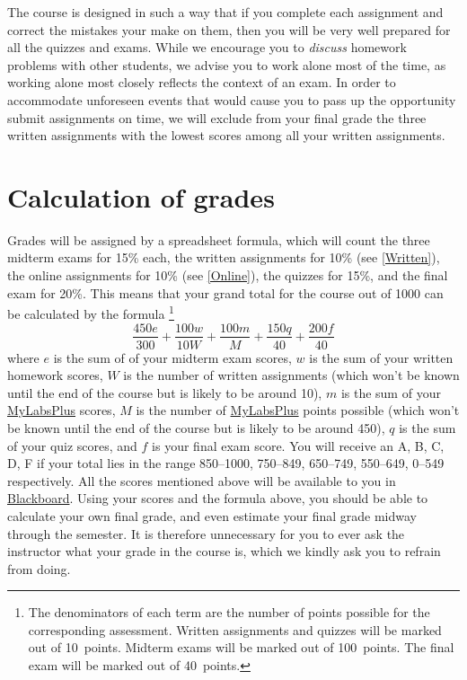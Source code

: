 \documentclass[11pt]{article}
\begin{document}
The course is designed in such a way that if you complete each assignment and 
correct the mistakes your make on them,
then you will be very well prepared for all the quizzes and exams.
While we encourage you to {\em discuss} homework problems with other
students, we advise you to work alone most of the time,
as working alone most closely reflects the context of an exam.
In order to accommodate unforeseen events that would cause you
to pass up the opportunity submit assignments on time,
we will exclude from your final grade
the three written assignments with the lowest scores among
all your written assignments.

\section{Calculation of grades}\label{Assessment}
Grades will be assigned by a spreadsheet formula, which will count
the three midterm exams for 15\% each,
the written assignments for 10\% (see \autoref{Written}),
the online assignments for 10\% (see \autoref{Online}),
the quizzes for 15\%, and the final exam for 20\%.
This means that your grand total for the course out of 1000
can be calculated by the formula
\footnote{The denominators of each term are the number of points possible
for the corresponding assessment. Written assignments and quizzes will be marked
out of 10~points. Midterm exams will be marked out of 100~points. The final exam
will be marked out of 40~points.}
\[\frac{450e}{300}+\frac{100w}{10W}
+\frac{100m}{M}+\frac{150q}{40}+\frac{200f}{40}\]
where $e$ is the sum of of your midterm exam scores,
$w$ is the sum of your written homework scores, $W$ is the
number of written assignments (which won't be known until
the end of the course but is likely to be around 10),
$m$ is the sum of your
\href{http://iastate.mylabsplus.com}{MyLabsPlus} scores,
$M$ is the number of 
\href{http://iastate.mylabsplus.com}{MyLabsPlus} points possible
(which won't be known until the end of the course but is likely
to be around 450), $q$ is the sum
of your quiz scores, and $f$ is your final exam score.
You will receive an A, B, C, D, F if your total lies in the range
850--1000, 750--849, 650--749, 550--649, 0--549 respectively.
All the scores mentioned above will be available to you in
\href{https://bb.its.iastate.edu}{Blackboard}. Using your scores
and the formula above, you should be able to calculate your own final grade,
and even estimate your final grade midway through the semester.
It is therefore unnecessary for you to ever ask the instructor
what your grade in the course is, which we kindly ask you to refrain from
doing.
\end{document}
